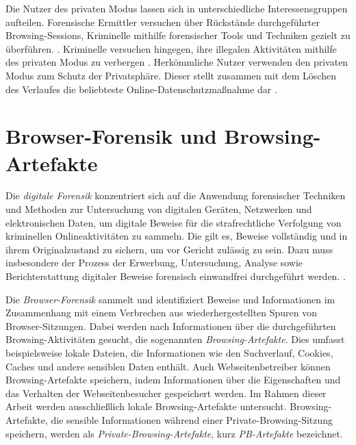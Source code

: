 Die Nutzer des privaten Modus lassen sich in unterschiedliche Interessensgruppen aufteilen. 
Forensische Ermittler versuchen über Rückstände durchgeführter Browsing-Sessions, Kriminelle mithilfe forensischer Tools und Techniken gezielt zu überführen. \cite{Montasari.2015}. Kriminelle versuchen hingegen, ihre illegalen Aktivitäten mithilfe des privaten Modus zu verbergen \cite{Mahlous.2020}. 
Herkömmliche Nutzer verwenden den privaten Modus zum Schutz der Privatsphäre. Dieser stellt zusammen mit dem Löschen des Verlaufes die beliebteste Online-Datenschutzmaßnahme dar \cite{Horsman.2019}. 

\section{Browser-Forensik und Browsing-Artefakte}\label{chap:theorie-browser-forensics-artefakte} %

Die \textit{digitale Forensik} konzentriert sich auf die Anwendung forensischer Techniken und Methoden zur Untersuchung von digitalen Geräten, Netzwerken und elektronischen Daten, um digitale Beweise für die strafrechtliche Verfolgung von kriminellen Onlineaktivitäten zu sammeln.
Die gilt es, Beweise vollständig und in ihrem Originalzustand zu sichern, um vor Gericht zulässig zu sein. Dazu muss insbesondere der Prozess der Erwerbung, Untersuchung, Analyse sowie Berichterstattung digitaler Beweise forensisch einwandfrei durchgeführt werden.  \cite{Izzati.2022}.

Die \textit{Browser-Forensik} sammelt und identifiziert Beweise und Informationen im Zusammenhang mit einem Verbrechen aus wiederhergestellten Spuren von Browser-Sitzungen. 
Dabei werden nach Informationen über die durchgeführten Browsing-Aktivitäten gesucht, die sogenannten \textit{Browsing-Artefakte}. 
Dies umfasst beispielsweise lokale Dateien, die Informationen wie den Suchverlauf, Cookies, Caches und andere sensiblen Daten enthält. Auch Webseitenbetreiber können Browsing-Artefakte speichern, indem Informationen über die Eigenschaften und das Verhalten der Webseitenbesucher gespeichert werden. Im Rahmen dieser Arbeit werden ausschließlich lokale Browsing-Artefakte untersucht.  \cite{Izzati.2022}
Browsing-Artefakte, die sensible Informationen während einer Private-Browsing-Sitzung speichern, werden als \textit{Private-Browsing-Artefakte}, kurz \textit{PB-Artefakte} bezeichnet.

